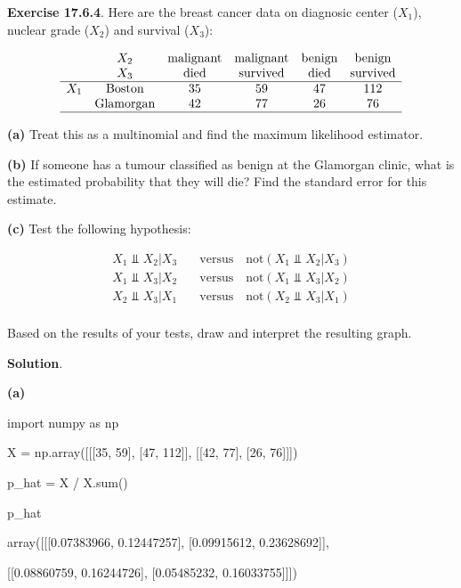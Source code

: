 \textbf{Exercise 17.6.4}. Here are the breast cancer data on diagnosic
center (\(X_1\)), nuclear grade (\(X_2\)) and survival (\(X_3\)):

\[
\begin{array}{cccccc}
    & X_2 & \text{malignant} & \text{malignant} & \text{benign} & \text{benign}   \\
    & X_3 & \text{died}      & \text{survived}  & \text{died}   & \text{survived} \\
\hline
X_1 & \text{Boston}    & 35 & 59 & 47 & 112 \\
    & \text{Glamorgan} & 42 & 77 & 26 & 76 \\
\hline
\end{array}
\]

\textbf{(a)} Treat this as a multinomial and find the maximum likelihood
estimator.

\textbf{(b)} If someone has a tumour classified as benign at the
Glamorgan clinic, what is the estimated probability that they will die?
Find the standard error for this estimate.

\textbf{(c)} Test the following hypothesis:

\[
\begin{align}
X_1 \text{ ⫫ } X_2 |  X_3 \quad &\text{versus} \quad \text{not} (X_1 \text{ ⫫ } X_2 |  X_3 ) \\
X_1 \text{ ⫫ } X_3 |  X_2 \quad &\text{versus} \quad \text{not} (X_1 \text{ ⫫ } X_3 |  X_2 ) \\
X_2 \text{ ⫫ } X_3 |  X_1 \quad &\text{versus} \quad \text{not} (X_2 \text{ ⫫ } X_3 |  X_1 ) \\
\end{align}
\]

Based on the results of your tests, draw and interpret the resulting
graph.

\textbf{Solution}.

\textbf{(a)}

\begin{python}
import numpy as np

X = np.array([[[35, 59], [47, 112]], [[42, 77], [26, 76]]])
\end{python}

\begin{python}
p_hat = X / X.sum()

p_hat
\end{python}

\begin{console}
array([[[0.07383966, 0.12447257],
        [0.09915612, 0.23628692]],

       [[0.08860759, 0.16244726],
        [0.05485232, 0.16033755]]])
\end{console}

